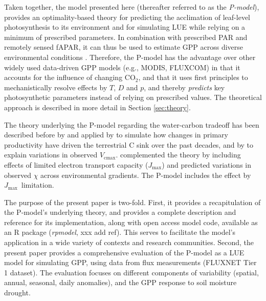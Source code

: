 \documentclass{myreport}
\newcommand{\vcmax}{$V_{\text{cmax}}$}
\newcommand{\jmax}{$J_{\text{max}}$}
\begin{document}
Taken together, the model presented here (thereafter referred to as the \textit{P-model}), provides an optimality-based theory for predicting the acclimation of leaf-level photosynthesis to its environment and for simulating LUE while relying on a minimum of prescribed parameters. In combination with prescribed PAR and remotely sensed fAPAR, it can thus be used to estimate GPP across diverse environmental conditions \citep{wang17natpl}. Therefore, the P-model has the advantage over other widely used data-driven GPP models (e.g., MODIS, FLUXCOM) in that it accounts for the influence of changing CO$_2$, and that it uses first principles to mechanistically resolve effects by $T$, $D$ and $p$, and thereby \textit{predicts} key photosynthetic parameters instead of relying on prescribed values. The theoretical approach is described in more detail in Section \ref{sec:theory}.

The theory underlying the P-model regarding the water-carbon tradeoff has been described before by \cite{prentice14ecollett} and applied by \cite{keenan17natcomm} to simulate how changes in primary productivity have driven the terrestrial C sink over the past decades, and by \cite{smith19ecollett} to explain variations in observed \vcmax .  \cite{wang17natpl} complemented the theory by including effects of limited electron transport capacity (\jmax ) and predicted variations in observed $\chi$ across environmental gradients. The P-model includes the effect by \jmax\ limitation.

The purpose of the present paper is two-fold. First, it provides a recapitulation of the P-model's underlying theory, and provides a complete description and reference for its implementation, along with open access model code, available as an R package (\textit{rpmodel}, xxx add ref). This serves to facilitate the model's application in a wide variety of contexts and research communities. Second, the present paper provides a comprehensive evaluation of the P-model as a LUE model for simulating GPP, using data from flux measurements (FLUXNET Tier 1 dataset). The evaluation focuses on different components of variability (spatial, annual, seasonal, daily anomalies), and the GPP response to soil moisture drought.
\end{document}
